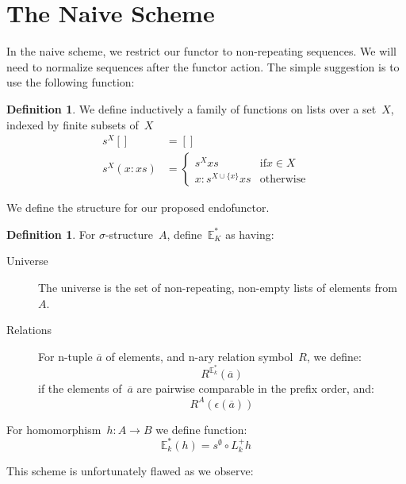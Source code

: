 \documentclass{article}
\theoremstyle{plain}
\theoremstyle{definition}
\newtheorem{definition}[theorem]{Definition}
\theoremstyle{remark}
\numberwithin{theorem}{section}
\begin{document}
\section{The Naive Scheme}
\label{sec:naive}
In the naive scheme, we restrict our functor to non-repeating sequences. We will need to normalize sequences after the functor action. The simple suggestion is to use the following function:
\begin{definition}
We define inductively a family of functions on lists over a set~$X$, indexed by finite subsets of~$X$
\begin{align*}
    s^X [] &= []\\
    s^X (x:xs) &=
    \begin{cases}
    s^X xs &\mbox{if} x \in X\\
    x : s^{X \cup \{ x \}} xs &\mbox{otherwise}
    \end{cases}
\end{align*}

\end{definition}
We define the structure for our proposed endofunctor.
\begin{definition}
For $\sigma$-structure~$A$, define~$\mathbb{E}^*_K$ as having:
\begin{description}
\item[Universe] The universe is the set of non-repeating, non-empty lists of elements from~$A$.
\item[Relations] For n-tuple $\overline{a}$ of elements, and n-ary relation symbol~$R$, we define:
\begin{equation*}
    R^{\mathbb{E}^*_k}(\overline{a})
\end{equation*}
if the elements of~$\overline{a}$ are pairwise comparable in the prefix order, and:
\begin{equation*}
    R^A(\epsilon(\overline{a}))
\end{equation*}
\end{description}
For homomorphism~$h : A \rightarrow B$ we define function:
\begin{equation*}
    \mathbb{E}^*_k(h) = s^\emptyset \circ L^+_k h
\end{equation*}
\end{definition}
This scheme is unfortunately flawed as we observe:
\end{document}
